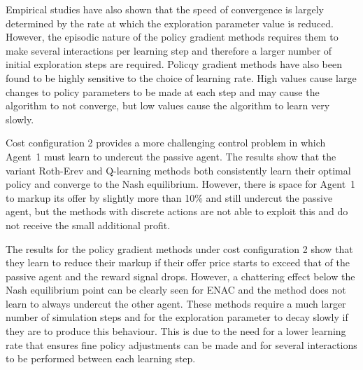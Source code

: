 Empirical studies have also shown that the speed of convergence is largely
determined by the rate at which the exploration parameter value is reduced.
However, the episodic nature of the policy gradient methods requires them to
make several interactions per learning step and therefore a larger number of
initial exploration steps are required.  Policqy gradient methods have also
been found to be highly sensitive to the choice of learning rate.  High
values cause large changes to policy parameters to be made at each step and
may cause the algorithm to not converge, but low values cause the
algorithm to learn very slowly.

Cost configuration 2 provides a more challenging control problem in which
Agent~1 must learn to undercut the passive agent.  The results show that the
variant Roth-Erev and Q-learning methods both consistently learn their optimal
policy and converge to the Nash equilibrium.  However, there is space for
Agent~1 to markup its offer by slightly more than 10\% and still undercut the
passive agent, but the methods with discrete actions are not able to exploit
this and do not receive the small additional profit.

The results for the policy gradient methods under cost configuration 2 show that
they learn to reduce their markup if their offer price starts to exceed that of
the passive agent and the reward signal drops.  However, a chattering effect
below the Nash equilibrium point can be clearly seen for ENAC and the method
does not learn to always undercut the other agent.  These methods require a much
larger number of simulation steps and for the exploration parameter to decay
slowly if they are to produce this behaviour.  This is due to the need for a
lower learning rate that ensures fine policy adjustments can be made and for
several interactions to be performed between each learning step.

